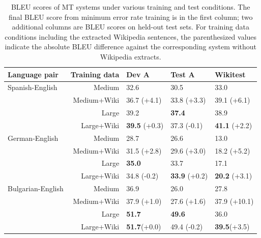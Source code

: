 \begin{table}[ht!]
\small
\begin{center}
\begin{tabular}{|lr||l||l|l|}
\hline
Language pair     & Training data     & Dev A             & Test A            & Wikitest     \\
\hline
Spanish-English   & Medium            & 32.6              & 30.5              & 33.0         \\
                  & Medium+Wiki       & 36.7 (+4.1)       & 33.8 (+3.3)       & 39.1 (+6.1)  \\
                  & Large             & 39.2              & \textbf{37.4}     & 38.9         \\
                  & Large+Wiki        &\textbf{39.5} (+0.3)&37.3 (-0.1)       & \textbf{41.1} (+2.2)  \\
\hline
German-English    & Medium            & 28.7              & 26.6              & 13.0         \\
                  & Medium+Wiki       & 31.5 (+2.8)       & 29.6 (+3.0)       & 18.2 (+5.2)  \\
                  & Large             & \textbf{35.0}     & 33.7              & 17.1         \\
                  & Large+Wiki        & 34.8 (-0.2)       &\textbf{33.9} (+0.2)&\textbf{20.2} (+3.1)  \\
\hline
Bulgarian-English & Medium            & 36.9              & 26.0              & 27.8         \\
                  & Medium+Wiki       & 37.9 (+1.0)       & 27.6 (+1.6)       & 37.9 (+10.1) \\
                  & Large             &\textbf{51.7}      &\textbf{49.6}      & 36.0         \\
                  & Large+Wiki        &\textbf{51.7}(+0.0)& 49.4 (-0.2)       &\textbf{39.5}(+3.5)  \\
\hline
\end{tabular}
\end{center}
\caption{BLEU scores of MT systems under various training and test
conditions.  The final BLEU score from minimum error rate training is in the
first column; two additional columns are BLEU scores on held-out test sets.
For training data conditions including the extracted Wikipedia sentences,
the parenthesized values indicate the absolute BLEU difference against the
corresponding system without Wikipedia extracts.}
\label{table:mtTestResults}
\end{table}

